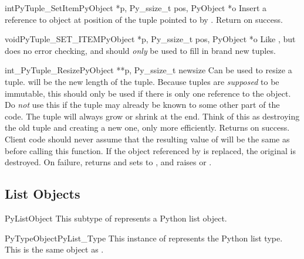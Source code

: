 \begin{cfuncdesc}{int}{PyTuple_SetItem}{PyObject *p,
                                        Py_ssize_t pos, PyObject *o}
  Insert a reference to object  at position  of the
  tuple pointed to by . Return  on success.
\end{cfuncdesc}

\begin{cfuncdesc}{void}{PyTuple_SET_ITEM}{PyObject *p,
                                          Py_ssize_t pos, PyObject *o}
  Like , but does no error checking, and
  should \emph{only} be used to fill in brand new tuples.  
\end{cfuncdesc}

\begin{cfuncdesc}{int}{_PyTuple_Resize}{PyObject **p, Py_ssize_t newsize}
  Can be used to resize a tuple.   will be the new length
  of the tuple.  Because tuples are \emph{supposed} to be immutable,
  this should only be used if there is only one reference to the
  object.  Do \emph{not} use this if the tuple may already be known to
  some other part of the code.  The tuple will always grow or shrink
  at the end.  Think of this as destroying the old tuple and creating
  a new one, only more efficiently.  Returns  on success.
  Client code should never assume that the resulting value of
   will be the same as before calling this function.
  If the object referenced by  is replaced, the
  original  is destroyed.  On failure, returns
   and sets  to \NULL{}, and raises
   or
  .
\end{cfuncdesc}


\subsection{List Objects \label{listObjects}}

\begin{ctypedesc}{PyListObject}
  This subtype of  represents a Python list object.
\end{ctypedesc}

\begin{cvardesc}{PyTypeObject}{PyList_Type}
  This instance of  represents the Python list
  type.  This is the same object as .
\end{cvardesc}


